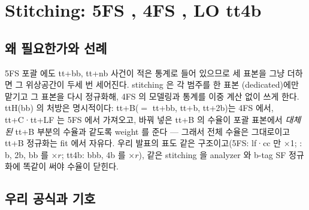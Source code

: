\section{Stitching: 5FS \texorpdfstring{\ttbar}{ttbar}, 4FS \texorpdfstring{\ttbb}{ttbb}, LO tt4b}\label{sec:samples-stitch}

\subsection{왜 필요한가와 선례}

5FS 포괄 \ttbar 에도 tt+bb, tt+nb 사건이 적은 통계로 들어 있으므로 세 표본을 그냥 더하면 그 위상공간이 두세 번 세어진다. stitching 은 각 범주를 한 표본
(dedicated)에만 맡기고 그 표본을 다시 정규화해, 4FS 의 모델링과 통계를 이중 계산 없이 쓰게 한다. ttH(bb) 의 처방은 명시적이다:
tt+B($=$ tt+bb, tt+b, tt+2b)는 4FS 에서, tt+C·tt+LF 는 5FS 에서 가져오고, 바꿔 넣은 tt+B 의 수율이 포괄 표본에서 \emph{대체된} tt+B 부분의 수율과 같도록 weight 를
준다 — 그래서 \ttbar 전체 수율은 그대로이고 tt+B 정규화는 fit 에서 자유다. 우리 발표의 표도 같은 구조이고(5FS: lf·cc 만 ×1;
\ttbb: b, 2b, bb 를 ×$r$; tt4b: bbb, 4b 를 ×$r$), 같은 stitching 을 analyzer 와 b-tag SF 정규화에 똑같이 써야 수율이 닫힌다.

\subsection{우리 공식과 기호}\label{sec:samples-stitch-formula}

